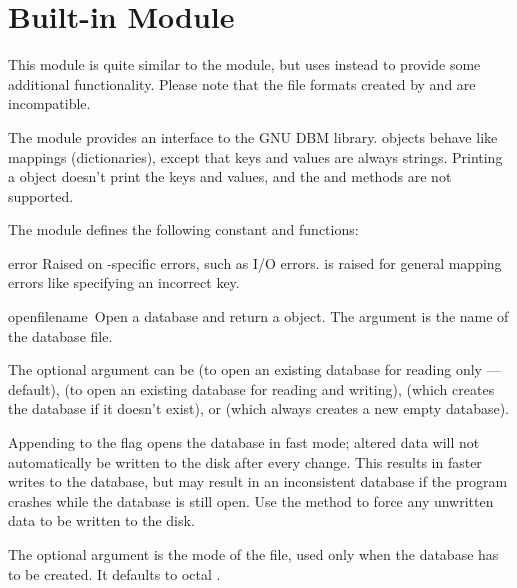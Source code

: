 \section{Built-in Module }
\label{module-gdbm}

%
%

This module is quite similar to the  module, but uses 
instead to provide some additional functionality.  Please note that
the file formats created by  and  are incompatible.

The  module provides an interface to the GNU DBM
library.   objects behave like mappings
(dictionaries), except that keys and values are always strings.
Printing a  object doesn't print the keys and values, and the
 and  methods are not supported.

The module defines the following constant and functions:

\begin{excdesc}{error}
Raised on -specific errors, such as I/O errors.  is
raised for general mapping errors like specifying an incorrect key.
\end{excdesc}

\begin{funcdesc}{open}{filename\, }
Open a  database and return a  object.  The
 argument is the name of the database file.

The optional  argument can be
 (to open an existing database for reading only --- default),
 (to open an existing database for reading and writing),
 (which creates the database if it doesn't exist), or
 (which always creates a new empty database).

Appending  to the flag opens the database in fast mode;
altered data will not automatically be written to the disk after every
change.  This results in faster writes to the database, but may result
in an inconsistent database if the program crashes while the database
is still open.  Use the  method to force any unwritten
data to be written to the disk.

The optional  argument is the \UNIX{} mode of the file, used
only when the database has to be created.  It defaults to octal
.
\end{funcdesc}

